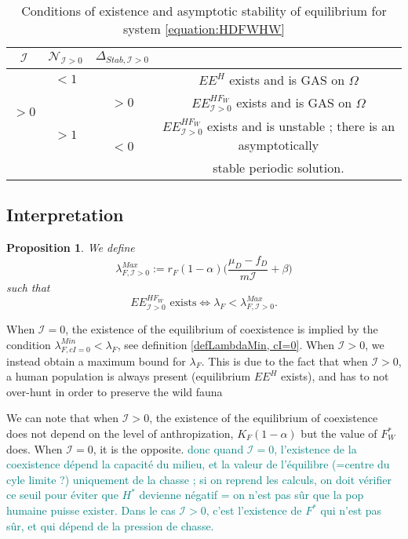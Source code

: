 \documentclass{article}
\newcommand{\lfw}{\lambda_{F}}
\newcommand{\lfw}{\lambda_{F}}
\newcommand{\cI}{\mathcal{I}}
\newcommand{\marc}[1]{\textcolor{teal}{#1}}
\newtheorem{prop}{Proposition}
\begin{document}
\begin{table}[!ht]
\def\arraystretch{2}
\centering
\begin{tabular}{c|c|c|c}
$\cI$ & $\mathcal{N}_{\cI > 0} $ & $\Delta_{Stab, \cI > 0}$ & \\
\hline
\multirow{3}{*}{$>0$} & $<1$ & &$EE^{H}$ exists and is GAS on $\Omega$ \\
\cline{2-4}
 & \multirow{3}{*}{$> 1$}  & $>0$ &$EE^{HF_W}_{\cI>0}$ exists and is GAS on $\Omega$ \\
 \cline{3-4}
 & & \multirow{2}{*}{$ < 0$} & $EE^{HF_W}_{\cI>0}$ exists and is unstable ; there is an asymptotically \\
 & & &  stable periodic solution. \\
\end{tabular}
\caption{\centering Conditions of existence and asymptotic stability of equilibrium for system \eqref{equation:HDFWHW}}
\end{table}

\subsection{Interpretation}

\begin{prop}
We define 
$$\lambda_{F, \cI>0}^{Max} := r_F(1-\alpha)\Big({\dfrac{\mu_D - f_D}{m\cI}+\beta\Big)}$$
such that 
$$
\text{$EE^{HF_W}_{\cI>0}$ exists} \Leftrightarrow  \lfw < \lambda_{F, \cI>0}^{Max}.
$$
\end{prop}

When $\cI = 0$, the existence of the equilibrium of coexistence is implied by the condition $\lambda_{F, cI = 0}^{Min} < \lfw$, see definition \ref{defLambdaMin, cI=0}. When $\cI > 0$, we instead obtain a maximum bound for $\lfw$. This is due to the fact that when $\cI > 0$, a human population is always present (equilibrium $EE^{H}$ exists), and has to not over-hunt in order to preserve the wild fauna 


We can note that when $\cI > 0$, the existence of the equilibrium of coexistence does not depend on the level of anthropization, $K_F(1-\alpha)$ but the value of $F^*_W$ does. When $\cI = 0$, it is the opposite. 
\marc{donc quand $\cI =0$, l'existence de la coexistence dépend la capacité du milieu, et la valeur de l'équilibre (=centre du cyle limite ?) uniquement de la chasse ; si on reprend les calculs, on doit vérifier ce seuil pour éviter que $H^*$ devienne négatif = on n'est pas sûr que la pop humaine puisse exister. Dans le cas $\cI > 0$, c'est l'existence de $F^*$ qui n'est pas sûr, et qui dépend de la pression de chasse.}
\end{document}
